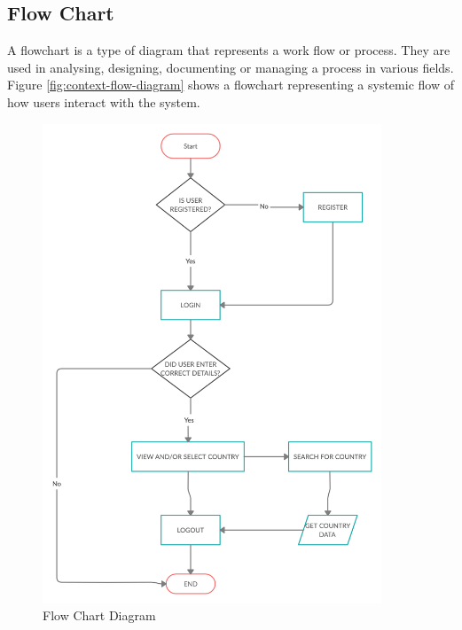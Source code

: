 \documentclass[twoside, a4paper, 12pt]{report}
\begin{document}
\subsection{Flow Chart}
A flowchart is a type of diagram that represents a work flow or process. They are used in analysing, designing, documenting or managing a process in various fields.\\
\indent
Figure \ref{fig:context-flow-diagram} shows a flowchart representing a systemic flow of how users interact with the system.

\begin{figure}
	\centering
	\includegraphics[width=0.9\textwidth]{flowchart.png}
	\caption{Flow Chart Diagram}
	\label{fig:flow-chart-diagram}
\end{figure}
\end{document}
